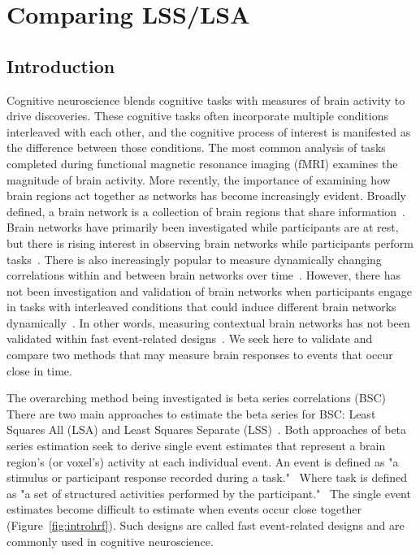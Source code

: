 \documentclass[phd,appendix,figures]{uithesis}
\begin{document}
\chapter{Comparing LSS/LSA}

\section*{Introduction}
\label{intro}

Cognitive neuroscience blends cognitive tasks with measures of brain activity to drive discoveries.
These cognitive tasks often incorporate multiple conditions interleaved with each other,
and the cognitive process of interest is manifested as the difference between those conditions.
The most common analysis of tasks completed during functional magnetic resonance imaging (fMRI)
examines the magnitude of brain activity.
More recently, the importance of examining how brain regions act together as networks has become increasingly evident.
Broadly defined, a brain network is a collection of brain regions that share information~\cite{Uddin2019}.
Brain networks have primarily been investigated while participants are at rest, but there
is rising interest in observing brain networks while participants perform tasks~\cite{Cole2014a}.
There is also increasingly popular to measure dynamically changing correlations
within and between brain networks over time~\cite{Sakoglu2008,Hindriks2016}.
However, there has not been investigation and validation of brain networks
when participants engage in tasks with interleaved conditions that could induce
different brain networks dynamically~\cite{Di2019a}.
In other words, measuring contextual brain networks has not been validated within fast event-related designs~\cite{Buckner1998}.
We seek here to validate and compare two methods that may measure brain responses to events that occur
close in time.

The overarching method being investigated is beta series correlations (BSC)~\cite{Rissman2004,Mumford2012,Turner2012a,Abdulrahman2016}
There are two main approaches to estimate the beta series for BSC: Least Squares All (LSA) and Least Squares Separate (LSS)~\cite{Mumford2012}.
Both approaches of beta series estimation seek to derive single event estimates that represent a brain region's
(or voxel's) activity at each individual event.
An event is defined as "a stimulus or participant response recorded during a task."~\cite{Gorgolewski2016}
Where task is defined as "a set of structured activities performed by the participant."~\cite{Gorgolewski2016}
The single event estimates become difficult to estimate when events occur close together (Figure~\ref{fig:introhrf}).
Such designs are called fast event-related designs and are commonly
used in cognitive neuroscience.
\end{document}
